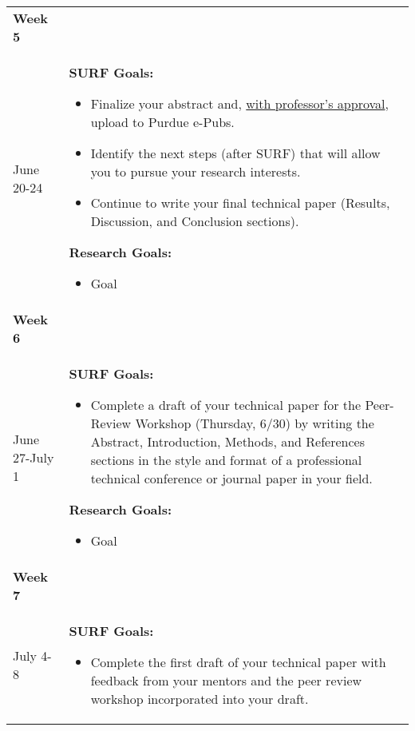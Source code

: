\documentclass[a4paper]{journal}
\begin{document}
\begin{longtable}{| m{} | p{}|}
  \hline
  \textbf{Week 5} & \\ June 20-24 &  \textbf{SURF Goals:}
                                    \begin{itemize}
                                      \item Finalize your abstract and, \underline{with professor’s approval}, upload to Purdue e-Pubs.
                                      \item Identify the next steps (after SURF) that will allow you to pursue your research interests.
                                      \item Continue to write your final technical paper (Results, Discussion, and Conclusion sections).
                                    \end{itemize}
                                    \textbf{Research Goals:}
                                    \begin{itemize}
                                      \item Goal
                                    \end{itemize}\\
  \hline
  \textbf{Week 6} & \\ June 27-July 1 &  \textbf{SURF Goals:}
                                    \begin{itemize}
                                      \item Complete a draft of your technical paper for the Peer-Review Workshop (Thursday, 6/30) by writing the Abstract, Introduction, Methods, and References sections in the style and format of a professional technical conference or journal paper in your field.
                                    \end{itemize}
                                    \textbf{Research Goals:}
                                    \begin{itemize}
                                      \item Goal
                                    \end{itemize}\\
  \hline
  \textbf{Week 7} & \\ July 4-8 &  \textbf{SURF Goals:}
                                    \begin{itemize}
                                      \item Complete the first draft of your technical paper with feedback from your mentors and the peer review workshop incorporated into your draft.

\end{itemize}
\end{longtable}
\end{document}
